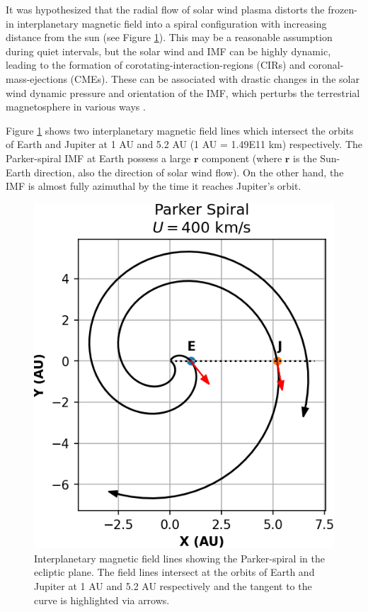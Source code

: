 It was hypothesized that the radial flow of solar wind plasma distorts the frozen-in interplanetary magnetic field into a spiral configuration with increasing distance from the sun \cite{Parker1958DynamicsFields.,Ness1964SolarField} (see Figure \ref{fig:parker-spiral}). This may be a reasonable assumption during quiet intervals, but the solar wind and IMF can be highly dynamic, leading to the formation of corotating-interaction-regions (CIRs) and coronal-mass-ejections (CMEs). These can be associated with drastic changes in the solar wind dynamic pressure and orientation of the IMF, which perturbs the terrestrial magnetosphere in various ways \cite{Borovsky2006DifferencesStorms,Denton2006GeomagneticWind}. 

Figure \ref{fig:parker-spiral} shows two interplanetary magnetic field lines which intersect the orbits of Earth and Jupiter at 1 AU and 5.2 AU (1 AU = 1.49E11 km) respectively. The Parker-spiral IMF at Earth possess a large $\mathbf{r}$ component (where $\mathbf{r}$ is the Sun-Earth direction, also the direction of solar wind flow). On the other hand, the IMF is almost fully azimuthal by the time it reaches Jupiter's orbit.

\begin{figure}
    \centering
    \includegraphics{images1/parker-spiral.png}
    \caption{Interplanetary magnetic field lines showing the Parker-spiral in the ecliptic plane. The field lines intersect at the orbits of Earth and Jupiter at 1 AU and 5.2 AU respectively and the tangent to the curve is highlighted via arrows.}
    \label{fig:parker-spiral}
\end{figure}


